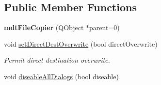 \subsection*{Public Member Functions}
\begin{DoxyCompactItemize}
\item 
\hypertarget{classmdt_file_copier_a32fc7a1c4d796ce0f3781c24257a0a02}{
{\bfseries mdtFileCopier} (QObject $\ast$parent=0)}
\label{classmdt_file_copier_a32fc7a1c4d796ce0f3781c24257a0a02}

\item 
void \hyperlink{classmdt_file_copier_ad045db0c7b84a7c9505d7ac1704f7413}{setDirectDestOverwrite} (bool directOverwrite)
\begin{DoxyCompactList}\small\item\em Permit direct destination overwrite. \end{DoxyCompactList}\item 
\hypertarget{classmdt_file_copier_a46d25119a130f224d6bb1ba2f8dbf79c}{
void \hyperlink{classmdt_file_copier_a46d25119a130f224d6bb1ba2f8dbf79c}{diseableAllDialogs} (bool diseable)}
\label{classmdt_file_copier_a46d25119a130f224d6bb1ba2f8dbf79c}


\end{DoxyCompactItemize}
